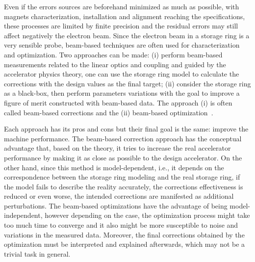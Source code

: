 Even if the errors sources are beforehand minimized as much as possible, with magnets characterization, installation and alignment reaching the specifications, these processes are limited by finite precision and the residual errors may still affect negatively the electron beam. Since the electron beam in a storage ring is a very sensible probe, beam-based techniques are often used for characterization and optimization. Two approaches can be made: (i) perform beam-based measurements related to the linear optics and coupling and guided by the accelerator physics theory, one can use the storage ring model to calculate the corrections with the design values as the final target; (ii) consider the storage ring as a black-box, then perform parameters variations with the goal to improve a figure of merit constructed with beam-based data. The approach (i) is often called beam-based corrections and the (ii) beam-based optimization~\cite{huang2019beam}.


Each approach has its pros and cons but their final goal is the same: improve the machine performance. The beam-based correction approach has the conceptual advantage that, based on the theory, it tries to increase the real accelerator performance by making it as close as possible to the design accelerator. On the other hand, since this method is model-dependent, i.e., it depends on the correspondence between the storage ring modeling and the real storage ring, if the model fails to describe the reality accurately, the corrections effectiveness is reduced or even worse, the intended corrections are manifested as additional perturbations. The beam-based optimizations have the advantage of being model-independent, however depending on the case, the optimization process might take too much time to converge and it also might be more susceptible to noise and variations in the measured data. Moreover, the final corrections obtained by the optimization must be interpreted and explained afterwards, which may not be a trivial task in general.

